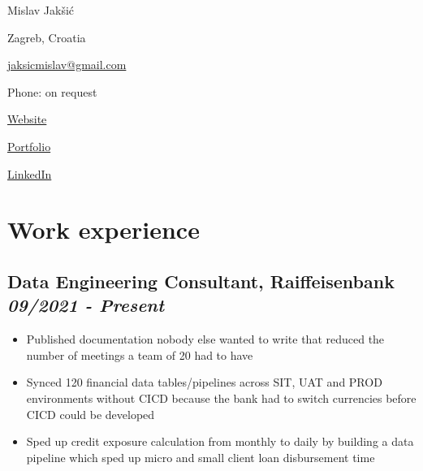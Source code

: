 \documentclass[a4paper]{article}
\newcommand{\bolditalicpair}
[2]
{\textbf{#1} \texorpdfstring{\hfill}{} \textit{#2}}
\begin{document}
\pagecolor{BackgroundColor}

\begin{multicols}{3}

\noindent
\begin{minipage}{.22\textwidth}
\raggedright

{\huge Mislav Jakšić}

Zagreb, Croatia
\end{minipage}

\noindent
\begin{minipage}{.50\textwidth}
\raggedleft

\href{mailto:jaksicmislav@gmail.com}{jaksicmislav@gmail.com}

Phone: on request

\end{minipage}

\noindent
\begin{minipage}{.32\textwidth}
\raggedleft

\href{https://mislav-jaksic.from.hr/}{Website}

\href{https://github.com/MislavJaksic}{Portfolio}

\href{https://www.linkedin.com/in/mislav-jaksic}{LinkedIn}

\end{minipage}

\end{multicols}



\section{Work experience}

\subsection{\bolditalicpair{Data Engineering Consultant, Raiffeisenbank}{09/2021 - Present}}

\begin{itemize}
 \item Published documentation nobody else wanted to write that reduced the number of meetings a team of 20 had to have
 \item Synced 120 financial data tables/pipelines across SIT, UAT and PROD environments without CICD because the bank had to switch currencies before CICD could be developed
 \item Sped up credit exposure calculation from monthly to daily by building a data pipeline which sped up micro and small client loan disbursement time
\end{itemize}
\end{document}
